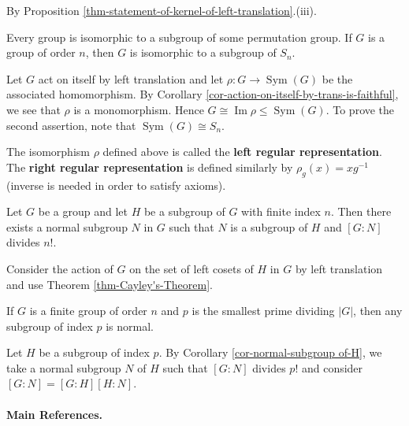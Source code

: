 \begin{sketch}
	By Proposition \ref{thm-statement-of-kernel-of-left-translation}.(iii).
\end{sketch}
\begin{theorem} \label{thm-Cayley's-Theorem}
	Every group is isomorphic to a subgroup of some permutation group. If $G$ is a group of order $n$, then $G$ is isomorphic to a subgroup of $S_n$.
\end{theorem}
\begin{sketch}
	Let $G$ act on itself by left translation and let $\rho:G\rightarrow \operatorname{Sym}(G)$ be the associated homomorphism. By Corollary \ref{cor-action-on-itself-by-trans-is-faithful}, we see that $\rho$ is a monomorphism. Hence $G\cong \operatorname{Im}\rho \leq \operatorname{Sym}(G)$. To prove the second assertion, note that $\operatorname{Sym}(G) \cong S_n$.
\end{sketch}
\begin{definition}
	The isomorphism $\rho$ defined above is called the \textbf{left regular representation}. The \textbf{right regular representation} is defined similarly by $\rho_g(x) = xg^{-1}$ (inverse is needed in order to satisfy axioms). 
\end{definition}
\begin{corollary}\label{cor-normal-subgroup of-H}
	Let $G$ be a group and let $H$ be a subgroup of $G$ with finite index $n$. Then there exists a normal subgroup $N$ in $G$ such that $N$ is a subgroup of $H$ and $[G:N]$ divides $n!$.
\end{corollary}
\begin{sketch}
	Consider the action of $G$ on the set of left cosets of $H$ in $G$ by left translation and use Theorem \ref{thm-Cayley's-Theorem}.
\end{sketch}
\begin{corollary}
	If $G$ is a finite group of order $n$ and $p$ is the smallest prime dividing $|G|$,
	then any subgroup of index $p$ is normal.
\end{corollary}
\begin{sketch}
	Let $H$ be a subgroup of index $p$. By Corollary \ref{cor-normal-subgroup of-H}, we take a normal subgroup $N$ of $H$ such that $[G:N]$ divides $p!$ and consider $[G:N] = [G:H][H:N]$.
\end{sketch}

\paragraph{Main References.} \cite{DummitFoote2004,Rotman1995,Hungerford1974,Isaacs2009}


